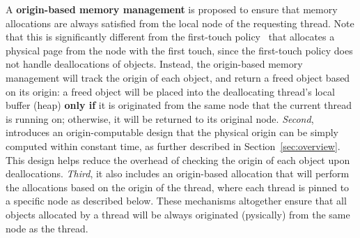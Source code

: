 A \textbf{origin-based memory management} is proposed to ensure that memory allocations are always satisfied from the local node of the requesting thread. Note that this is significantly different from the first-touch policy~\cite{lameter2013numa} that allocates a physical page from the node with the first touch, since the first-touch policy does not handle deallocations of objects. Instead, the origin-based memory management will track the origin of each object, and return a freed object based on its origin: a freed object will be placed into the deallocating thread's local buffer (heap) \textbf{only if} it is originated from the same node that the current thread is running on; otherwise, it will be returned to its original node. \textit{Second}, \NM{} introduces an origin-computable design that the physical origin can be simply computed within constant time, as further described in Section~\ref{sec:overview}. This design helps reduce the overhead of checking the origin of each object upon deallocations. \textit{Third}, it also includes an origin-based allocation that will perform the allocations based on the origin of the thread, where each thread is pinned to a specific node as described below. These mechanisms altogether ensure that all objects allocated by a thread will be always originated (pysically) from the same node as the thread. 

